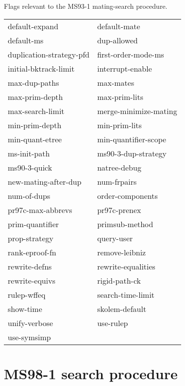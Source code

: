 \begin{description} 
\item[MS93-1]  
Flags relevant to the MS93-1 mating-search procedure.

\begin{tabular}{l l}
default-expand&default-mate\\
default-ms&dup-allowed\\
duplication-strategy-pfd&first-order-mode-ms\\
initial-bktrack-limit&interrupt-enable\\
max-dup-paths&max-mates\\
max-prim-depth&max-prim-lits\\
max-search-limit&merge-minimize-mating\\
min-prim-depth&min-prim-lits\\
min-quant-etree&min-quantifier-scope\\
ms-init-path&ms90-3-dup-strategy\\
ms90-3-quick&natree-debug\\
new-mating-after-dup&num-frpairs\\
num-of-dups&order-components\\
pr97c-max-abbrevs&pr97c-prenex\\
prim-quantifier&primsub-method\\
prop-strategy&query-user\\
rank-eproof-fn&remove-leibniz\\
rewrite-defns&rewrite-equalities\\
rewrite-equivs&rigid-path-ck\\
rulep-wffeq&search-time-limit\\
show-time&skolem-default\\
unify-verbose&use-rulep\\
use-symsimp
\end{tabular}
\item
\end{description}

\section{MS98-1 search procedure}

